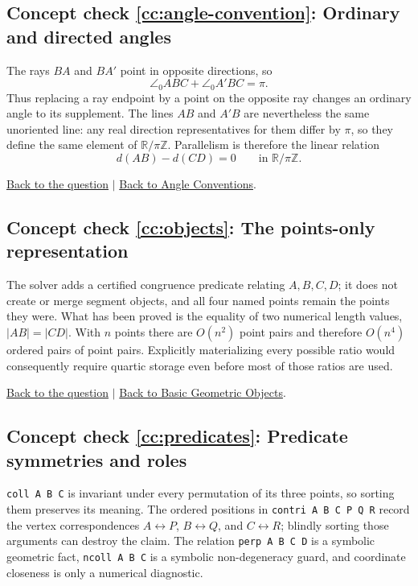 \documentclass[reqno]{amsart}
\DeclareMathOperator{\1}{\textbf{1}}
\begin{document}
\hypertarget{cca:angle-convention}{}
\subsection*{Concept check \ref{cc:angle-convention}: Ordinary and directed angles}

The rays $BA$ and $BA'$ point in opposite directions, so
\[
\angle_0ABC+\angle_0A'BC=\pi.
\]
Thus replacing a ray endpoint by a point on the opposite ray changes an
ordinary angle to its supplement.  The lines $AB$ and $A'B$ are nevertheless
the same unoriented line: any real direction representatives for them differ
by $\pi$, so they define the same element of
$\mathbb R/\pi\mathbb Z$.  Parallelism is therefore the linear relation
\[
d(AB)-d(CD)=0\qquad\text{in }\mathbb R/\pi\mathbb Z.
\]

\noindent\hyperlink{ccq:angle-convention}{Back to the question}
$\mid$
\hyperref[sec: Angle Conventions]{Back to Angle Conventions}.

\hypertarget{cca:objects}{}
\subsection*{Concept check \ref{cc:objects}: The points-only representation}

The solver adds a certified congruence predicate relating $A,B,C,D$; it does
not create or merge segment objects, and all four named points remain the
points they were. What has been proved is the equality of two numerical
length values, $|AB|=|CD|$. With $n$ points there are $O(n^2)$ point pairs and
therefore $O(n^4)$ ordered pairs of point pairs. Explicitly materializing every
possible ratio would consequently require quartic storage even before most of
those ratios are used.

\noindent\hyperlink{ccq:objects}{Back to the question}
$\mid$
\hyperref[sec: Basic Geometric Objects]{Back to Basic Geometric Objects}.

\hypertarget{cca:predicates}{}
\subsection*{Concept check \ref{cc:predicates}: Predicate symmetries and roles}

\verb|coll A B C| is invariant under every permutation of its three points,
so sorting them preserves its meaning. The ordered positions in
\verb|contri A B C P Q R| record the vertex correspondences
$A\leftrightarrow P$, $B\leftrightarrow Q$, and $C\leftrightarrow R$; blindly
sorting those arguments can destroy the claim. The relation
\verb|perp A B C D| is a symbolic geometric fact, \verb|ncoll A B C| is a
symbolic non-degeneracy guard, and coordinate closeness is only a numerical
diagnostic.
\end{document}
